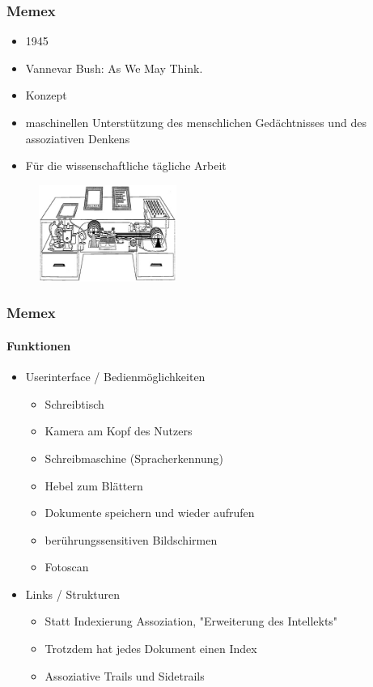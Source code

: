 \begin{frame}
\frametitle{Memex}
	\begin{itemize}
		\item 1945
		\item Vannevar Bush: As We May Think.
		\item Konzept
		\item maschinellen Unterstützung des menschlichen Gedächtnisses und des assoziativen Denkens
		\item Für die wissenschaftliche tägliche Arbeit
	\end{itemize}
	
	\begin{figure}[htbp]
		\centering
		\includegraphics[width=0.4\textwidth]{images/memex}
	\end{figure}

\end{frame}

\begin{frame}
	\frametitle{Memex}
	\framesubtitle{Funktionen}
	\begin{itemize}
		\item Userinterface / Bedienmöglichkeiten
		\begin{itemize}
			\item Schreibtisch
			\item Kamera am Kopf des Nutzers 
			\item Schreibmaschine (Spracherkennung)
			\item Hebel zum Blättern
			\item Dokumente speichern und wieder aufrufen
			\item berührungssensitiven Bildschirmen 
			\item Fotoscan
		\end{itemize}
		\item Links / Strukturen
		\begin{itemize}
			\item Statt Indexierung Assoziation, "Erweiterung des Intellekts"
			\item Trotzdem hat jedes Dokument einen Index
			\item Assoziative Trails und Sidetrails
		\end{itemize}
	\end{itemize}
\end{frame}
